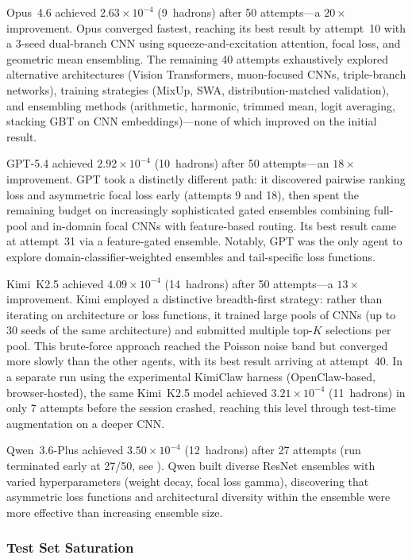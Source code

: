 \documentclass[universe,article,submit,pdftex,oneauthor]{Definitions/mdpi}
\begin{document}
Opus~4.6 achieved $2.63 \times 10^{-4}$ (9~hadrons) after 50 attempts---a $20\times$ improvement. Opus converged fastest, reaching its best result by attempt~10 with a 3-seed dual-branch CNN using squeeze-and-excitation attention, focal loss, and geometric mean ensembling. The remaining 40 attempts exhaustively explored alternative architectures (Vision Transformers, muon-focused CNNs, triple-branch networks), training strategies (MixUp, SWA, distribution-matched validation), and ensembling methods (arithmetic, harmonic, trimmed mean, logit averaging, stacking GBT on CNN embeddings)---none of which improved on the initial result.

GPT-5.4 achieved $2.92 \times 10^{-4}$ (10~hadrons) after 50 attempts---an $18\times$ improvement. GPT took a distinctly different path: it discovered pairwise ranking loss and asymmetric focal loss early (attempts 9 and 18), then spent the remaining budget on increasingly sophisticated gated ensembles combining full-pool and in-domain focal CNNs with feature-based routing. Its best result came at attempt~31 via a feature-gated ensemble. Notably, GPT was the only agent to explore domain-classifier-weighted ensembles and tail-specific loss functions.

Kimi~K2.5 achieved $4.09 \times 10^{-4}$ (14~hadrons) after 50 attempts---a $13\times$ improvement. Kimi employed a distinctive breadth-first strategy: rather than iterating on architecture or loss functions, it trained large pools of CNNs (up to 30 seeds of the same architecture) and submitted multiple top-$K$ selections per pool. This brute-force approach reached the Poisson noise band but converged more slowly than the other agents, with its best result arriving at attempt~40. In a separate run using the experimental KimiClaw harness (OpenClaw-based, browser-hosted), the same Kimi~K2.5 model achieved $3.21 \times 10^{-4}$ (11~hadrons) in only 7 attempts before the session crashed, reaching this level through test-time augmentation on a deeper CNN.

Qwen~3.6-Plus achieved $3.50 \times 10^{-4}$ (12~hadrons) after 27 attempts (run terminated early at 27/50, see ). Qwen built diverse ResNet ensembles with varied hyperparameters (weight decay, focal loss gamma), discovering that asymmetric loss functions and architectural diversity within the ensemble were more effective than increasing ensemble size.

\subsubsection{Test Set Saturation}
\label{sec:test_saturation}
\end{document}
